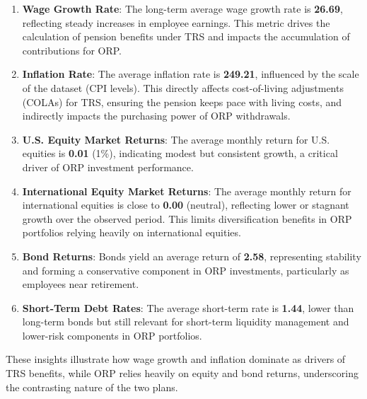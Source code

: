 \documentclass[
  letterpaper,
  DIV=11,
  numbers=noendperiod]{scrartcl}
\begin{document}
\begin{enumerate}
\def\labelenumi{\arabic{enumi}.}
\item
  \textbf{Wage Growth Rate}: The long-term average wage growth rate is
  \textbf{26.69}, reflecting steady increases in employee earnings. This
  metric drives the calculation of pension benefits under TRS and
  impacts the accumulation of contributions for ORP.
\item
  \textbf{Inflation Rate}: The average inflation rate is
  \textbf{249.21}, influenced by the scale of the dataset (CPI levels).
  This directly affects cost-of-living adjustments (COLAs) for TRS,
  ensuring the pension keeps pace with living costs, and indirectly
  impacts the purchasing power of ORP withdrawals.
\item
  \textbf{U.S. Equity Market Returns}: The average monthly return for
  U.S. equities is \textbf{0.01} (1\%), indicating modest but consistent
  growth, a critical driver of ORP investment performance.
\item
  \textbf{International Equity Market Returns}: The average monthly
  return for international equities is close to \textbf{0.00} (neutral),
  reflecting lower or stagnant growth over the observed period. This
  limits diversification benefits in ORP portfolios relying heavily on
  international equities.
\item
  \textbf{Bond Returns}: Bonds yield an average return of \textbf{2.58},
  representing stability and forming a conservative component in ORP
  investments, particularly as employees near retirement.
\item
  \textbf{Short-Term Debt Rates}: The average short-term rate is
  \textbf{1.44}, lower than long-term bonds but still relevant for
  short-term liquidity management and lower-risk components in ORP
  portfolios.
\end{enumerate}

These insights illustrate how wage growth and inflation dominate as
drivers of TRS benefits, while ORP relies heavily on equity and bond
returns, underscoring the contrasting nature of the two plans.
\end{document}
